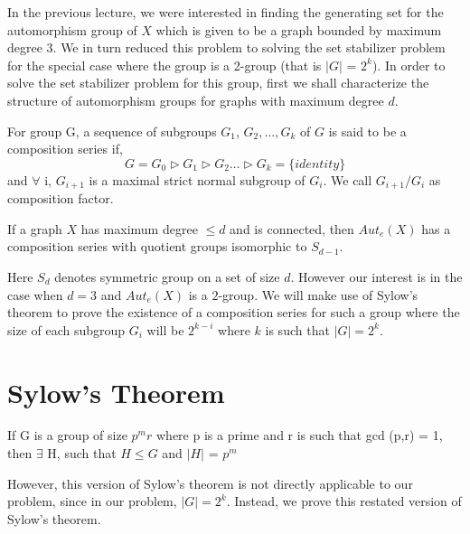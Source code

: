 
In the previous lecture, we were interested in finding the generating set for
the automorphism group of $X$ which is given to be a graph bounded by maximum
degree 3. We in turn reduced this problem to solving the set stabilizer
problem for the special case where the group is a 2-group (that is $|G|$ =
$2^{k}$). 
In order to solve the
set stabilizer problem for this group, first we shall characterize the
structure of automorphism groups for graphs with maximum degree $d$.

\begin{definition}
For group G, a sequence of subgroups $G_{1}$, $G_{2},\ldots, G_{k}$ of $G$ is
said to be a composition series if,
\[ G = G_{0} \triangleright G_{1} \triangleright G_{2} \ldots
	\triangleright G_{k} = \{identity\} \]
and $\forall$ i, $G_{i+1}$ is a maximal strict normal subgroup of $G_{i}$. 
We call $G_{i+1} / G_{i}$ as composition factor.
\end{definition}

\begin{claim}
If a graph $X$ has maximum degree $\leq d$ and is connected, then $Aut_{e}(X)$
has a composition series with quotient groups isomorphic to $S_{d-1}$.
\end{claim}
Here $S_d$ denotes symmetric group on a set of size $d$.
However our interest is in the case when $d = 3$ and $Aut_{e}(X)$ is a
$2$-group. We will make use of Sylow's theorem to prove the existence of a
composition series for such a group where the size of each subgroup $G_{i}$
will be $2^{k - i}$ where $k$ is such that $|G| = 2^{k}$. 

\section{Sylow's Theorem}

\begin{theorem} \label{thm:sylow}
If G is a group of size $p^{m}r$ where p is a prime and r is such that gcd (p,r) = 1, then $\exists$ H, such that $H \leqslant G$ and $|H|$ = $p^{m}$
\end{theorem}

However, this version of Sylow's theorem is not directly applicable to our problem, since in our problem, $|G| = 2^{k}$. Instead, we prove this restated version of Sylow's theorem.


